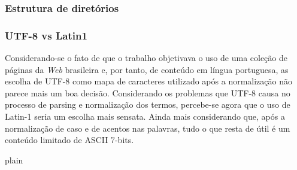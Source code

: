 \documentclass[10pt,twocolumn]{article}
\begin{document}
\subsubsection{Estrutura de diretórios}

\subsubsection{UTF-8 vs Latin1}

Considerando-se o fato de que o trabalho objetivava o uso de uma coleção
de páginas da \emph{Web} brasileira e, por tanto, de conteúdo em língua
portuguesa, as escolha de UTF-8 como mapa de caracteres utilizado após a
normalização não parece mais um boa decisão. Considerando os problemas
que UTF-8 causa no processo de parsing e normalização dos termos,
percebe-se agora que o uso de Latin-1 seria um escolha mais sensata.
Ainda mais considerando que, após a normalização de caso e de acentos
nas palavras, tudo o que resta de útil é um conteúdo limitado de ASCII
7-bits.



 {plain}

\end{document}
